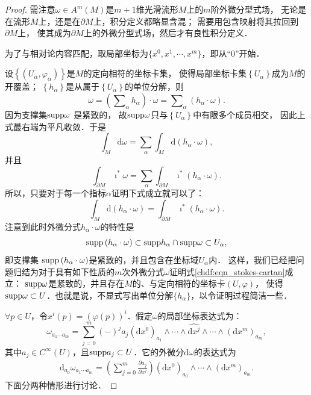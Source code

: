 \begin{proof}
    需注意$\omega \in A^{m}(M)$是$m+1$维光滑流形$M$上的$m$阶外微分型式场，
    无论是在流形$M$上，还是在$\partial M$上，积分定义都略显含混；
    需要用包含映射将其拉回到$\partial M$上，
    使其成为$\partial M$上的外微分型式场，然后才有良性积分定义．
    
    为了与相对论内容匹配，取局部坐标为$\{x^0,x^1,\cdots,x^m\}$，即从“$0$”开始．
    
    设$\left\{\left(U_\alpha, \varphi_\alpha\right)\right\}$是$M$的定向相符的坐标卡集，
    使得局部坐标卡集$\left\{U_\alpha\right\}$成为$M$的开覆盖；
    $\left\{h_\alpha\right\}$是从属于$\left\{U_\alpha\right\}$的单位分解，则
    \[
    \omega=\left(\sum\nolimits_\alpha h_\alpha\right) \cdot \omega
    =\sum\nolimits_\alpha \left(h_\alpha \cdot \omega\right) .
    \] 
    因为支撑集${\rm supp} \omega$ 是紧致的，
    故${\rm supp}\omega$只与$\left\{U_\alpha\right\}$中有限多个成员相交，
    因此上式最右端为平凡收敛．于是
    \[
    \int_M \mathrm{d} \omega=\sum_\alpha \int_M \mathrm{d}\left(h_\alpha \cdot \omega\right),
    \]  
    并且
    \[
    \int_{\partial M} \imath^* \omega=\sum_\alpha \int_{\partial M} \imath^*\left(h_\alpha \cdot \omega\right) .
    \]
    所以，只要对于每一个指标$\alpha$证明下式成立就可以了：
    \begin{equation}
    	\int_M \mathrm{d}\left(h_\alpha \cdot \omega\right)=\int_{\partial M} \imath^*\left(h_\alpha \cdot \omega\right) .
    \end{equation}
    注意到此时外微分式$h_\alpha \cdot \omega$的特性是
    \[
    {\rm supp} \left(h_\alpha \cdot \omega\right) \subset {\rm supp} h_\alpha \cap {\rm supp} \omega \subset U_\alpha,
    \]
    即支撑集 ${\rm supp} \left(h_\alpha \cdot \omega\right)$是紧致的，并且包含在坐标域$U_\alpha$内．
    这样，我们已经把问题归结为对于具有如下性质的$m$次外微分式$\omega$证明式\eqref{chdf:eqn_stokes-cartan}成立：
    ${\rm supp}\omega$是紧致的，并且存在$M$的、与定向相符的坐标卡$(U, \varphi)$，
    使得${\rm supp} \omega \subset U$．也就是说，不显式写出单位分解$\{h_\alpha\}$，以令证明过程简洁一些．
    
    $\forall p \in U$，令$x^i(p)=(\varphi(p))^i$．假定$\omega$的局部坐标表达式为：
    \begin{equation}
    	\omega_{a_1 \cdots a_m}=\sum_{j=0}^m (-)^{j} a_j (\mathrm{d} x^0)_{a_1} \wedge \cdots 
    	\wedge \widehat{\mathrm{d}x^j}  \wedge \cdots \wedge (\mathrm{d} x^m)_{a_m},
    \end{equation}
    其中$a_j \in C^{\infty}(U)$，且${\rm supp} a_j \subset U$．它的外微分$\mathrm{d} \omega$的表达式为
    \begin{align}
    	\mathrm{d}_{a_0} \omega_{a_1 \cdots a_m}= 
    	\left(\sum\nolimits_{j=0}^m \frac{\partial a_j}{\partial x^j}\right) 
    	(\mathrm{d} x^0)_{a_0} \wedge \cdots \wedge (\mathrm{d} x^m)_{a_m} .
    \end{align}    
    下面分两种情形进行讨论．
    

\end{proof}
